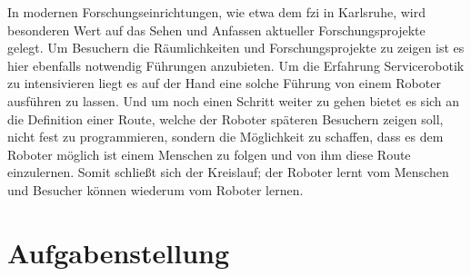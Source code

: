 In modernen Forschungseinrichtungen, wie etwa dem \gls{fzi} in Karlsruhe, wird besonderen Wert auf das Sehen und Anfassen aktueller Forschungsprojekte gelegt\cite{fziHoLL}.
Um Besuchern die Räumlichkeiten und Forschungsprojekte zu zeigen ist es hier ebenfalls notwendig Führungen anzubieten. Um die Erfahrung Servicerobotik zu intensivieren liegt es auf der Hand eine solche Führung von einem Roboter ausführen zu lassen. Und um noch einen Schritt weiter zu gehen bietet es sich an die Definition einer Route, welche der Roboter späteren Besuchern zeigen soll, nicht fest zu programmieren, sondern die Möglichkeit zu schaffen, dass es dem Roboter möglich ist einem Menschen zu folgen und von ihm diese Route einzulernen. Somit schließt sich der Kreislauf; der Roboter lernt vom Menschen und Besucher können wiederum vom Roboter lernen.
 
%
% 

\section{Aufgabenstellung}
\label{einleitung_aufgabenstellung_sec}
\authorsection{\editorjulian, \editortobias}

